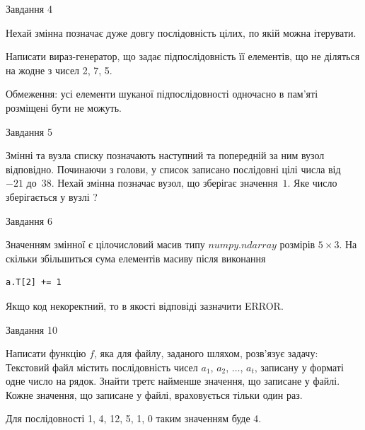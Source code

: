 \documentclass[12pt, ukrainian]{article}
\begin{document}
{\begin{minipage}[t]{8.0cm}
\end{minipage}


               
{\begin{center}Завдання {4}\end{center}}
\vspace{-4mm}
Нехай змінна  позначає дуже довгу послідовність цілих, по якій можна ітерувати.

Написати вираз-генератор, що задає підпослідовність її елементів, що не діляться на жодне з чисел 2, 7, 5.

Обмеження: усі елементи шуканої підпослідовності одночасно в пам'яті розміщені бути не можуть.\par

\vspace{10mm}
               
{\begin{center}Завдання {5}\end{center}}
\vspace{-4mm}
Змінні  та  вузла списку позначають наступний та попередній за ним вузол відповідно. Починаючи з голови, у список записано послідовні цілі числа від~$-21$ до~$38$. Нехай змінна  позначає вузол, що зберігає значення~$1$.
Яке число зберігається у вузлі  ?\par

               
{\begin{center}Завдання {6}\end{center}}
\vspace{-4mm}
Значенням змінної  є цілочисловий масив типу $numpy.ndarray$ розмірів $5{\times}3$. На скільки збільшиться сума елементів масиву  після виконання
\begin{verbatim}
a.T[2] += 1
\end{verbatim}


Якщо код некоректний, то в якості відповіді зазначити ERROR.\par

               
{\begin{center}Завдання {10}\end{center}}
\vspace{-4mm}

Написати функцію $f$, яка для файлу, заданого шляхом, розв’язує задачу:\\ Текстовий файл містить послідовність чисел $a_1$, $a_2$, $\ldots$, $a_t$, записану у форматі одне число на рядок. Знайти третє найменше значення, що записане у файлі. Кожне значення, що записане у файлі, враховується тільки один раз. \par
Для послідовності 1, 4, 12, 5, 1, 0 таким значенням буде 4.

}
\end{document}

